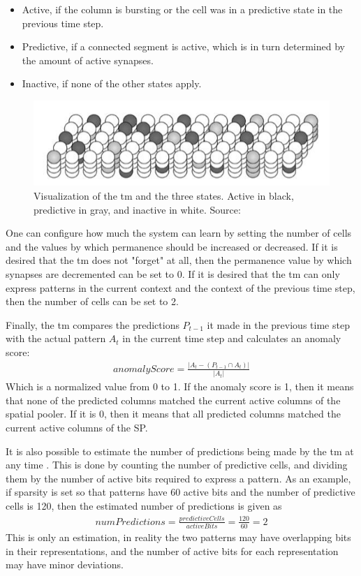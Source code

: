 \begin{itemize}
    \item Active, if the column is bursting or the cell was in a predictive state in the previous time step.
    \item Predictive, if a connected segment is active, which is in turn determined by the amount of active synapses.
    \item Inactive, if none of the other states apply.
\end{itemize}
\begin{figure}[H]
    \centering
    \includegraphics[width=\linewidth]{resources/related_works/tm_vis_alt.png}
    \caption{Visualization of the \gls*{tm} and the three states. Active in black, predictive in gray, and inactive in white. Source: \cite{BAMI}}
\end{figure}
One can configure how much the system can learn by setting the number of cells and the values by which permanence should be increased or decreased. If it is desired that the \gls*{tm} does not "forget" at all, then the permanence value by which synapses are decremented can be set to 0. If it is desired that the \gls*{tm} can only express patterns in the current context and the context of the previous time step, then the number of cells can be set to 2.
\par
Finally, the \gls*{tm} compares the predictions $P_{t-1}$ it made in the previous time step with the actual pattern $A_t$ in the current time step and calculates an anomaly score:
\begin{align*}
    anomalyScore=\frac{|A_t-(P_{t-1}\cap A_t)|}{|A_t|}
\end{align*}
Which is a normalized value from 0 to 1. If the anomaly score is 1, then it means that none of the predicted columns matched the current active columns of the spatial pooler. If it is 0, then it means that all predicted columns matched the current active columns of the SP.\par
It is also possible to estimate the number of predictions being made by the \gls*{tm} at any time \cite{htm_predictions_count}. This is done by counting the number of predictive cells, and dividing them by the number of active bits required to express a pattern. As an example, if sparsity is set so that patterns have 60 active bits and the number of predictive cells is 120, then the estimated number of predictions is given as
\begin{align*}
    numPredictions=\frac{predictiveCells}{activeBits}=\frac{120}{60}=2
\end{align*}
This is only an estimation, in reality the two patterns may have overlapping bits in their representations, and the number of active bits for each representation may have minor deviations.
